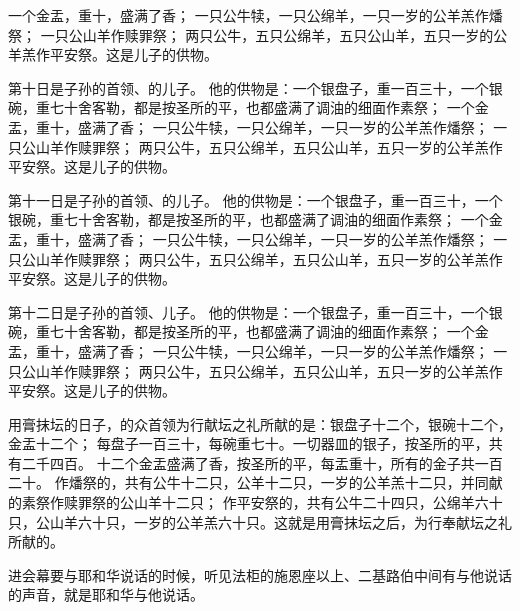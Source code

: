 {一个金盂，重十{}，盛满了香；
一只公牛犊，一只公绵羊，一只一岁的公羊羔作燔祭；
一只公山羊作赎罪祭；
两只公牛，五只公绵羊，五只公山羊，五只一岁的公羊羔作平安祭。这是{}儿子{}的供物。
\par }{\PP {}第十日{}是{}子孙的首领、{}的儿子{}。
他的供物是：一个银盘子，重一百三十{}，一个银碗，重七十舍客勒，都是按圣所的平，也都盛满了调油的细面作素祭；
一个金盂，重十{}，盛满了香；
一只公牛犊，一只公绵羊，一只一岁的公羊羔作燔祭；
一只公山羊作赎罪祭；
两只公牛，五只公绵羊，五只公山羊，五只一岁的公羊羔作平安祭。这是{}儿子{}的供物。
\par }{\PP {}第十一日{}是{}子孙的首领、{}的儿子{}。
他的供物是：一个银盘子，重一百三十{}，一个银碗，重七十舍客勒，都是按圣所的平，也都盛满了调油的细面作素祭；
一个金盂，重十{}，盛满了香；
一只公牛犊，一只公绵羊，一只一岁的公羊羔作燔祭；
一只公山羊作赎罪祭；
两只公牛，五只公绵羊，五只公山羊，五只一岁的公羊羔作平安祭。这是{}儿子{}的供物。
\par }{\PP {}第十二日{}是{}子孙的首领、{}儿子{}。
他的供物是：一个银盘子，重一百三十{}，一个银碗，重七十舍客勒，都是按圣所的平，也都盛满了调油的细面作素祭；
一个金盂，重十{}，盛满了香；
一只公牛犊，一只公绵羊，一只一岁的公羊羔作燔祭；
一只公山羊作赎罪祭；
两只公牛，五只公绵羊，五只公山羊，五只一岁的公羊羔作平安祭。这是{}儿子{}的供物。
\par }{\PP {}用膏抹坛的日子，{}的众首领为行献坛之礼所献的是：银盘子十二个，银碗十二个，金盂十二个；
每盘子{}一百三十{}，每碗重七十{}。一切器皿的银子，按圣所的平，共有二千四百{}。
十二个金盂盛满了香，按圣所的平，每盂重十{}，所有的金子共一百二十{}。
作燔祭的，共有公牛十二只，公羊十二只，一岁的公羊羔十二只，并同献的素祭作赎罪祭的公山羊十二只；
作平安祭的，共有公牛二十四只，公绵羊六十只，公山羊六十只，一岁的公羊羔六十只。这就是用膏抹坛之后，为行奉献坛之礼所献的。
\par }{\PP {}进会幕要与耶和华说话的时候，听见法柜的施恩座以上、二基路伯中间有与他说话的声音，就是耶和华与他说话。

}
